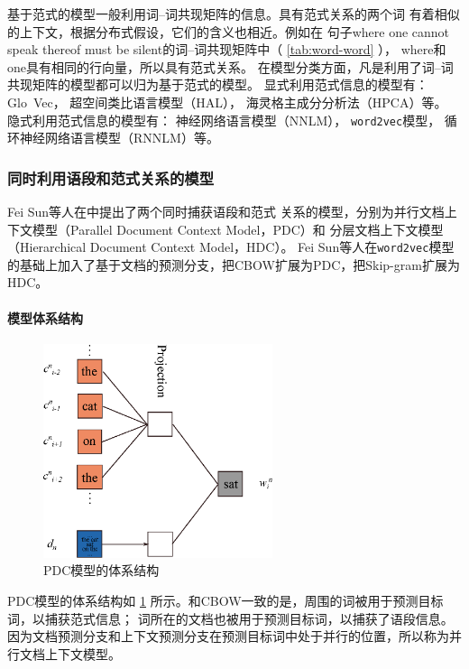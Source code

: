 基于范式的模型一般利用词--词共现矩阵的信息。具有范式关系的两个词
有着相似的上下文，根据分布式假设，它们的含义也相近。例如在
句子where one cannot speak thereof must be silent的词--词共现矩阵中（ \cref{tab:word-word} ），
where和one具有相同的行向量，所以具有范式关系。
在模型分类方面，凡是利用了词--词共现矩阵的模型都可以归为基于范式的模型。
显式利用范式信息的模型有：
Glo~Vec\cite{pennington2014glove}，
超空间类比语言模型（HAL）\cite{lund95}，
海灵格主成分分析法（HPCA）\cite{DBLP:conf/eacl/LebretC14}等。
隐式利用范式信息的模型有：
神经网络语言模型（NNLM）\cite{DBLP:journals/jmlr/BengioDVJ03}，
\texttt{word2vec}模型\cite{DBLP:journals/corr/abs-1301-3781}，
循环神经网络语言模型（RNNLM）\cite{DBLP:conf/interspeech/MikolovKBCK10}等。

\subsubsection{同时利用语段和范式关系的模型}
Fei Sun等人在\cite{DBLP:conf/acl/SunGLXC15}中提出了两个同时捕获语段和范式
关系的模型，分别为并行文档上下文模型（Parallel Document Context Model，PDC）和
分层文档上下文模型（Hierarchical Document Context Model，HDC）。
Fei Sun等人在\texttt{word2vec}模型的基础上加入了基于文档的预测分支，把CBOW扩展为PDC，把Skip-gram扩展为HDC。

\paragraph{模型体系结构}
\begin{figure}
  \includegraphics[width=0.6\textwidth]{figures/jointly-parallel-arch.eps}
  \centering
  \caption{PDC模型的体系结构\cite{DBLP:conf/acl/SunGLXC15}}
  \label{fig:jointly-pdc}
\end{figure}

PDC模型的体系结构如 \cref{fig:jointly-pdc} 所示。和CBOW一致的是，周围的词被用于预测目标词，以捕获范式信息；
词所在的文档也被用于预测目标词，以捕获了语段信息。
因为文档预测分支和上下文预测分支在预测目标词中处于并行的位置，所以称为并行文档上下文模型。

